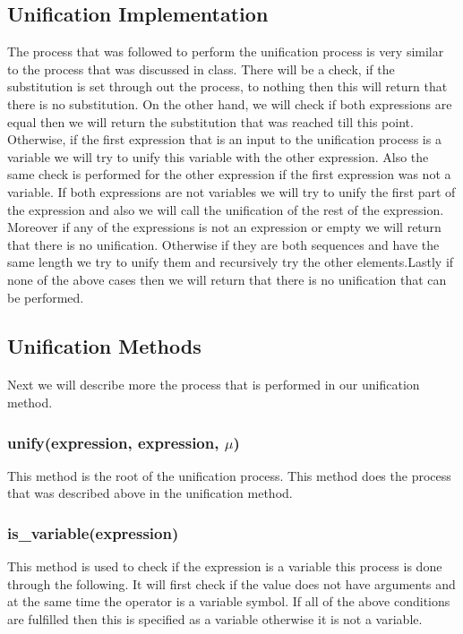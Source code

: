 {\subsection{Unification Implementation}\label{unificationMethod}
The process that was followed to perform the unification process is very similar to the process that was discussed in class. There will be a check, if the substitution is set through out the process, to nothing then this will return that there is no substitution. On the other hand, we will check if both expressions are equal then we will return the substitution that was reached till this point. Otherwise, if the first expression that is an input to the unification process is a variable we will try to unify this variable with the other expression. Also the same check is performed for the other expression if the first expression was not a variable. If both expressions are not variables we will try to unify the first part of the expression and also we will call the unification of the rest of the expression. Moreover if any of the expressions is not an expression or empty we will return that there is no unification. Otherwise if they are both sequences and have the same length we try to unify them and recursively try the other elements.Lastly if none of the above cases then we will return that there is no unification that can be performed.
\subsection{Unification Methods}
\paragraph*{}
Next we will describe more the process that is performed in our unification method.
\subsubsection{unify(expression, expression, $\mu$)}
This method is the root of the unification process. This method does the process that was described above in the unification method.
\subsubsection{is\_variable(expression)}
This method is used to check if the expression is a variable this process is done through the following. It will first check if the value does not have arguments and at the same time the operator is a variable symbol. If all of the above conditions are fulfilled then this is specified as a variable otherwise it is not a variable.

}
